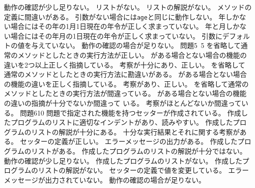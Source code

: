 {{ {動作の確認が少し足りない。}
 }
 {
 {リストがない。}
 {リストの解説がない。}
 {メソッドの定義に間違いがある。}
 {引数がない場合には\texttt{age}と同じに動作しない。}
 {年しかない場合にはその年の1月1日現在の年令が正しく求まっていない。}
 {年と月しかない場合にはその年月の1日現在の年令が正しく求まっていない。}
 {引数にデフォルトの値を与えていない。}
 {動作の確認の場合が足りない。}
 }
 {問題5\hspace*{0.6zw}\newline\ \Must}{5}{
 {を省略して通常のメソッドとしたときの実行方法が正しい。}
 {がある場合とない場合の機能の違いを2つ以上正しく指摘している。}
 {考察が十分にあり、正しい。}
 }
 {
 {を省略して通常のメソッドとしたときの実行方法に勘違いがある。}
 {がある場合とない場合の機能の違いを正しく指摘している。}
 {考察があり、正しい。}
 }
 {
 {を省略して通常のメソッドとしたときの実行方法が間違っている。}
 {がある場合とない場合の機能の違いの指摘が十分でないか間違って
 いる。}
 {考察がほとんどないか間違っている。}
 }
 {問題6}{10}{
 {問題で指定された機能を持つセッターが作成されている。}
 {作成したプログラムのリストに適切なインデントがあり、読みやすい。}
 {作成したプログラムのリストの解説が十分にある。}
 {十分な実行結果とそれに関する考察がある。}
 }
 {
 {セッターの定義が正しい。}
 {エラーメッセージの出力がある。}
 {作成したプログラムのリストがある。}
 {作成したプログラムのリストの解説が十分ではない。}
 {動作の確認が少し足りない。}
 }
 {
 {作成したプログラムのリストがない。}
 {作成したプログラムのリストの解説がない。}
 {セッターの定義で値を変更している。}
 {エラーメッセージが出力されていない。}
 {動作の確認の場合が足りない。}
 }
 }
 